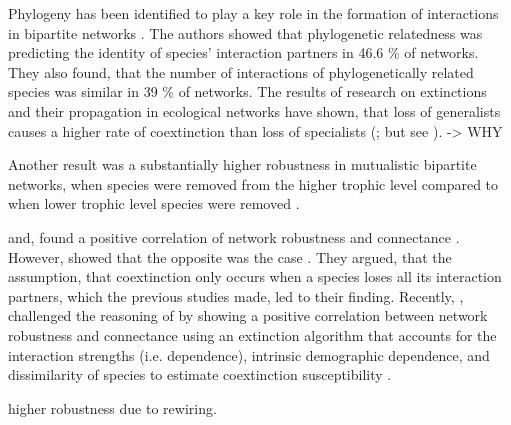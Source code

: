 \documentclass[12pt,a4paper]{article}
\begin{document}
Phylogeny has been identified to play a key role in the formation of interactions in bipartite networks \parencite{Rezende2007}. The authors showed that phylogenetic relatedness was predicting the identity of species' interaction partners in 46.6 \% of networks. They also found, that the number of interactions of phylogenetically related species was similar in 39 \% of networks.
The results of research on extinctions and their propagation in ecological networks have shown, that loss of generalists causes a higher rate of coextinction than loss of specialists (\cite{Memmott2004, Kaiser-Bunbury2010, Traveset2017, Bastazini2018, Vizentin-Bugoni2019, Biella2020}; but see \cite{Dunne2002}). 
-> WHY

Another result was a substantially higher robustness in mutualistic bipartite networks, when species were removed from the higher trophic level compared to when lower trophic level species were removed \parencite{Schleuning2016}.


\citeauthor{Dunne2002, Ekloef2006} and, \citeauthor{Thebault2010} found a positive correlation of network robustness and connectance \parencite{Dunne2002, Ekloef2006, Thebault2010}. However, \citeauthor{Vieira2015} showed that the opposite was the case \parencite{Vieira2015}. They argued, that the assumption, that coextinction only occurs when a species loses all its interaction partners, which the previous studies made, led to their finding. Recently, \citeauthor{Baumgartner2020}, challenged the reasoning of \citeauthor{Vieira2015} by showing a positive correlation between network robustness and connectance using an extinction algorithm that accounts for the interaction strengths (i.e. dependence), intrinsic demographic dependence, and dissimilarity of species to estimate coextinction susceptibility \parencite{Baumgartner2020}. 


\parencite{Kaiser-Bunbury2010, Schleuning2016, Timoteo2016, Costa2018} higher robustness due to rewiring. %
\end{document}
